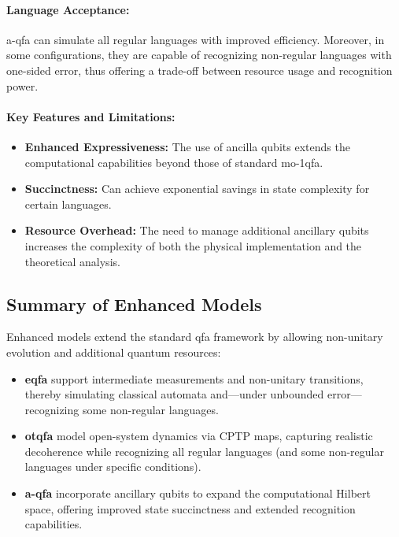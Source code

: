 \paragraph{Language Acceptance:}  
\gls{a-qfa} can simulate all regular languages with improved efficiency. Moreover, in some configurations, they are capable of recognizing non-regular languages with one-sided error, thus offering a trade-off between resource usage and recognition power.

\paragraph{Key Features and Limitations:}
\begin{itemize}
    \item \textbf{Enhanced Expressiveness:} The use of ancilla qubits extends the computational capabilities beyond those of standard \gls{mo-1qfa}.
    \item \textbf{Succinctness:} Can achieve exponential savings in state complexity for certain languages.
    \item \textbf{Resource Overhead:} The need to manage additional ancillary qubits increases the complexity of both the physical implementation and the theoretical analysis.
\end{itemize}

\subsection*{Summary of Enhanced Models}
Enhanced models extend the standard \gls{qfa} framework by allowing non-unitary evolution and additional quantum resources:
\begin{itemize}
    \item \textbf{\gls{eqfa}} support intermediate measurements and non-unitary transitions, thereby simulating classical automata and—under unbounded error—recognizing some non-regular languages.
    \item \textbf{\gls{otqfa}} model open-system dynamics via CPTP maps, capturing realistic decoherence while recognizing all regular languages (and some non-regular languages under specific conditions).
    \item \textbf{\gls{a-qfa}} incorporate ancillary qubits to expand the computational Hilbert space, offering improved state succinctness and extended recognition capabilities.
\end{itemize}

